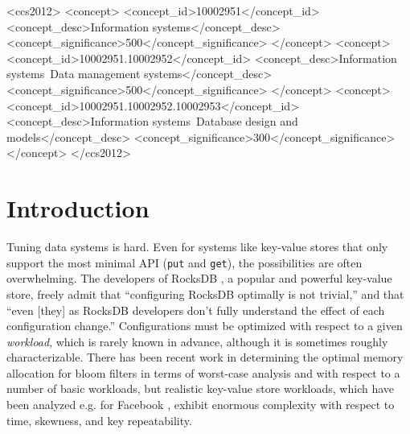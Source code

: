 \documentclass{sig-alternate-05-2015}
\begin{document}
%
%
\begin{CCSXML}
<ccs2012>
<concept>
	<concept_id>10002951</concept_id>
	<concept_desc>Information systems</concept_desc>
	<concept_significance>500</concept_significance>
</concept>
<concept>
	<concept_id>10002951.10002952</concept_id>
	<concept_desc>Information systems~Data management systems</concept_desc>
	<concept_significance>500</concept_significance>
</concept>
<concept>
	<concept_id>10002951.10002952.10002953</concept_id>
	<concept_desc>Information systems~Database design and models</concept_desc>
	<concept_significance>300</concept_significance>
</concept>
</ccs2012>
\end{CCSXML}


%
%

%
%
\printccsdesc



\section{Introduction}
Tuning data systems is hard. Even for systems like key-value stores that only
support the most minimal API (\texttt{put} and \texttt{get}), the possibilities
are often overwhelming. The developers of RocksDB \cite{facebook:rocksdb}, a popular
and powerful key-value store, freely admit \cite{rocksdb-tuning-guide} that
``configuring RocksDB optimally is not trivial,'' and that ``even [they] as
RocksDB developers don't fully understand the effect of each configuration
change.'' Configurations must be optimized with respect to a given
\textit{workload}, which is rarely known in advance, although it is sometimes
roughly characterizable. There has been recent work \cite{monkey} in
determining the optimal memory allocation for bloom filters in terms of
worst-case analysis and with respect to a number of basic workloads, but
realistic key-value store workloads, which have been analyzed e.g. for Facebook
\cite{characterizing-memcached}, exhibit enormous complexity with respect to
time, skewness, and key repeatability.
\end{document}
